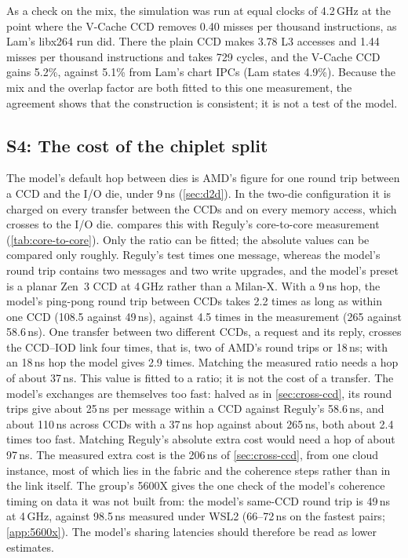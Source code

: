 

As a check on the mix, the simulation was run at equal clocks of 4.2\,GHz at the point where the V-Cache CCD removes 0.40 misses per thousand instructions, as Lam's libx264 run did. There the plain CCD makes 3.78 L3 accesses and 1.44 misses per thousand instructions and takes 729 cycles, and the V-Cache CCD gains 5.2\%, against 5.1\% from Lam's chart IPCs (Lam states 4.9\%). Because the mix and the overlap factor are both fitted to this one measurement, the agreement shows that the construction is consistent; it is not a test of the model.

\subsection{S4: The cost of the chiplet split}
\label{sec:sim-chiplet}
The model's default hop between dies is AMD's figure for one round trip between a CCD and the I/O die, under 9\,ns (\cref{sec:d2d}). In the two-die configuration it is charged on every transfer between the CCDs and on every memory access, which crosses to the I/O die.  compares this with Reguly's core-to-core measurement (\cref{tab:core-to-core}). Only the ratio can be fitted; the absolute values can be compared only roughly. Reguly's test times one message, whereas the model's round trip contains two messages and two write upgrades, and the model's preset is a planar Zen~3 CCD at 4\,GHz rather than a Milan-X. With a 9\,ns hop, the model's ping-pong round trip between CCDs takes 2.2 times as long as within one CCD (108.5 against 49\,ns), against 4.5 times in the measurement (265 against 58.6\,ns). One transfer between two different CCDs, a request and its reply, crosses the CCD--IOD link four times, that is, two of AMD's round trips or 18\,ns; with an 18\,ns hop the model gives 2.9 times. Matching the measured ratio needs a hop of about 37\,ns. This value is fitted to a ratio; it is not the cost of a transfer. The model's exchanges are themselves too fast: halved as in \cref{sec:cross-ccd}, its round trips give about 25\,ns per message within a CCD against Reguly's 58.6\,ns, and about 110\,ns across CCDs with a 37\,ns hop against about 265\,ns, both about 2.4 times too fast. Matching Reguly's absolute extra cost would need a hop of about 97\,ns. The measured extra cost is the 206\,ns of \cref{sec:cross-ccd}, from one cloud instance, most of which lies in the fabric and the coherence steps rather than in the link itself. The group's 5600X gives the one check of the model's coherence timing on data it was not built from: the model's same-CCD round trip is 49\,ns at 4\,GHz, against 98.5\,ns measured under WSL2 (66--72\,ns on the fastest pairs; \cref{app:5600x}). The model's sharing latencies should therefore be read as lower estimates.

